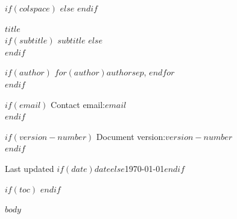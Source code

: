 \documentclass[
$if(fontsize)$
  $fontsize$,
$endif$
$if(papersize)$
  $papersize$paper,
$endif$
$for(classoption)$
  $classoption$$sep$,
$endfor$
]{$documentclass$}
\begin{document}
\pagestyle{otherpages}
\thispagestyle{firstpage}
\afterpage{\aftergroup\restoregeometry}

$if(colspace)$
  \setlength{\tabcolsep}{$colspace$}
$else$
  \setlength{\tabcolsep}{12pt}
$endif$

{\Large\bf $title$}\\[4pt]
$if(subtitle)$
  {\normalsize $subtitle$}
$else$
  \phantom{text}\\[-32pt]
$endif$

{\normalsize{%
$if(author)$
  $for(author)$$author$$sep$, $endfor$\\[-20pt]
$endif$}}

{\normalsize{%
$if(email)$
  Contact email:\;$email$\\[-20pt]
$endif$}}

{\normalsize{%
$if(version-number)$
  Document version:\;\texttt{$version-number$}\\[-20pt]
$endif$}}

Last updated $if(date)$$date$$else$\today$endif$
\vspace{1mm}


$if(toc)$
  \setcounter{page}{1}
  \setcounter{tocdepth}{2}
  \tableofcontents
$endif$

$body$
\end{document}
